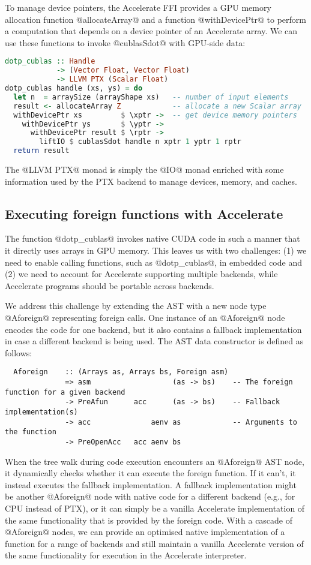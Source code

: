 To manage device pointers, the Accelerate FFI provides a GPU memory allocation function @allocateArray@ and a function @withDevicePtr@ to perform a computation that depends on a device pointer of an Accelerate array. We can use these functions to invoke @cublasSdot@ with GPU-side data:
%
\begin{lstlisting}[language=haskell]
dotp_cublas :: Handle
            -> (Vector Float, Vector Float)
            -> LLVM PTX (Scalar Float)
dotp_cublas handle (xs, ys) = do
  let n  = arraySize (arrayShape xs)   -- number of input elements
  result <- allocateArray Z            -- allocate a new Scalar array
  withDevicePtr xs         $ \xptr ->  -- get device memory pointers
    withDevicePtr ys       $ \yptr ->
      withDevicePtr result $ \rptr ->
        liftIO $ cublasSdot handle n xptr 1 yptr 1 rptr
  return result
\end{lstlisting}
%
The @LLVM PTX@ monad is simply the @IO@ monad enriched with some information used by the PTX backend to manage devices, memory, and caches.

\subsection{Executing foreign functions with Accelerate}

The function @dotp_cublas@ invokes native CUDA code in such a manner that it directly uses arrays in GPU memory. This leaves us with two challenges: (1) we need to enable calling functions, such as @dotp_cublas@, in embedded code and (2) we need to account for Accelerate supporting multiple backends, while Accelerate programs should be portable across backends.

We address this challenge by extending the AST with a new node type @Aforeign@ representing foreign calls. One instance of an @Aforeign@ node encodes the code for one backend, but it also contains a fallback implementation in case a different backend is being used. The AST data constructor is defined as follows:
%
\begin{lstlisting}
  Aforeign    :: (Arrays as, Arrays bs, Foreign asm)
              => asm                   (as -> bs)    -- The foreign function for a given backend
              -> PreAfun      acc      (as -> bs)    -- Fallback implementation(s)
              -> acc              aenv as            -- Arguments to the function
              -> PreOpenAcc   acc aenv bs
\end{lstlisting}
%
When the tree walk during code execution encounters an @Aforeign@ AST node, it dynamically checks whether it can execute the foreign function. If it can't, it instead executes the fallback implementation. A fallback implementation might be another @Aforeign@ node with native code for a different backend (e.g., for CPU instead of PTX), or it can simply be a vanilla Accelerate implementation of the same functionality that is provided by the foreign code. With a cascade of @Aforeign@ nodes, we can provide an optimised native implementation of a function for a range of backends and still maintain a vanilla Accelerate version of the same functionality for execution in the Accelerate interpreter.

